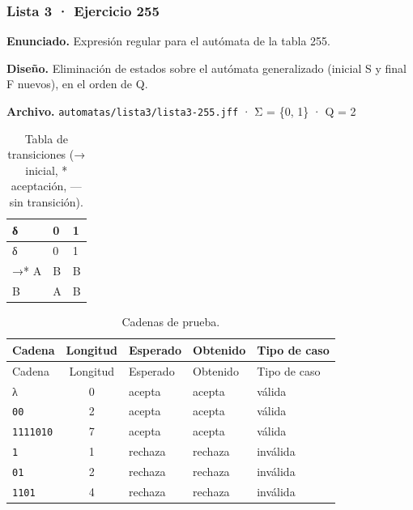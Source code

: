 
\hypertarget{lista-3-ejercicio-255}{%
\subsubsection{Lista 3 · Ejercicio 255}\label{lista-3-ejercicio-255}}

\textbf{Enunciado.} Expresión regular para el autómata de la tabla 255.

\textbf{Diseño.} Eliminación de estados sobre el autómata generalizado (inicial S y final F nuevos), en el orden de Q.

\textbf{Archivo.} \texttt{automatas/lista3/lista3-255.jff} · Σ = \{0, 1\} · \textbar Q\textbar{} = 2

\begin{longtable}[]{@{}lll@{}}
\caption{Tabla de transiciones (→ inicial, * aceptación, --- sin transición).}\tabularnewline
\toprule\noalign{}
δ & 0 & 1 \\
\midrule\noalign{}
\endfirsthead
\toprule\noalign{}
δ & 0 & 1 \\
\midrule\noalign{}
\endhead
\bottomrule\noalign{}
\endlastfoot
→* A & B & B \\
B & A & B \\
\end{longtable}

\begin{longtable}[]{@{}lclll@{}}
\caption{Cadenas de prueba.}\tabularnewline
\toprule\noalign{}
Cadena & Longitud & Esperado & Obtenido & Tipo de caso \\
\midrule\noalign{}
\endfirsthead
\toprule\noalign{}
Cadena & Longitud & Esperado & Obtenido & Tipo de caso \\
\midrule\noalign{}
\endhead
\bottomrule\noalign{}
\endlastfoot
λ & 0 & acepta & acepta & válida \\
\texttt{00} & 2 & acepta & acepta & válida \\
\texttt{1111010} & 7 & acepta & acepta & válida \\
\texttt{1} & 1 & rechaza & rechaza & inválida \\
\texttt{01} & 2 & rechaza & rechaza & inválida \\
\texttt{1101} & 4 & rechaza & rechaza & inválida \\
\end{longtable}

